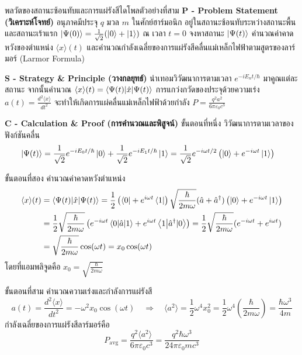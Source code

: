 \begin{psctbox}{พลวัตของสถานะซ้อนทับและการแผ่รังสีไดโพล}{ตัวอย่างที่สาม}
\noindent\textbf{P - Problem Statement (วิเคราะห์โจทย์)} อนุภาคมีประจุ $q$ มวล $m$ ในศักย์ฮาร์มอนิก อยู่ในสถานะซ้อนทับระหว่างสถานะพื้นและสถานะเร้าแรก $\ket{\Psi(0)} = \frac{1}{\sqrt{2}}(\ket{0} + \ket{1})$ ณ เวลา $t = 0$ จงหาสถานะ $\ket{\Psi(t)}$ คำนวณค่าคาดหวังของตำแหน่ง $\langle x \rangle(t)$ และคำนวณกำลังเฉลี่ยของการแผ่รังสีคลื่นแม่เหล็กไฟฟ้าตามสูตรของลาร์มอร์ (Larmor Formula)

\vspace{6pt}
\noindent\textbf{S - Strategy \& Principle (วางกลยุทธ์)} นำเทอมวิวัฒนาการตามเวลา $e^{-iE_n t/\hbar}$ มาคูณแต่ละสถานะ จากนั้นคำนวณ $\langle x \rangle(t) = \braket{\Psi(t)}{\hat{x}|\Psi(t)}$ การแกว่งกวัดของประจุด้วยความเร่ง $a(t) = \frac{d^2\langle x \rangle}{dt^2}$ จะทำให้เกิดการแผ่คลื่นแม่เหล็กไฟฟ้าด้วยกำลัง $P = \frac{q^2 a^2}{6\pi\varepsilon_0 c^3}$

\vspace{6pt}
\noindent\textbf{C - Calculation \& Proof (การคำนวณและพิสูจน์)}
ขั้นตอนที่หนึ่ง วิวัฒนาการตามเวลาของฟังก์ชันคลื่น
\begin{align}
\ket{\Psi(t)} &= \frac{1}{\sqrt{2}} e^{-iE_0 t/\hbar}\ket{0} + \frac{1}{\sqrt{2}} e^{-iE_1 t/\hbar}\ket{1} = \frac{1}{\sqrt{2}} e^{-i\omega t/2}\left( \ket{0} + e^{-i\omega t}\ket{1} \right)
\end{align}

ขั้นตอนที่สอง คำนวณค่าคาดหวังตำแหน่ง
\begin{align}
\langle x \rangle(t) &= \braket{\Psi(t)}{\hat{x}|\Psi(t)} = \frac{1}{2} \left( \bra{0} + e^{i\omega t}\bra{1} \right) \sqrt{\frac{\hbar}{2m\omega}}(\hat{a} + \hat{a}^\dagger) \left( \ket{0} + e^{-i\omega t}\ket{1} \right) \\
&= \frac{1}{2}\sqrt{\frac{\hbar}{2m\omega}} \left( e^{-i\omega t}\braket{0}{\hat{a}|1} + e^{i\omega t}\braket{1}{\hat{a}^\dagger|0} \right) = \frac{1}{2}\sqrt{\frac{\hbar}{2m\omega}} (e^{-i\omega t} + e^{i\omega t}) \\
&= \sqrt{\frac{\hbar}{2m\omega}} \cos(\omega t) = x_0 \cos(\omega t)
\end{align}
โดยที่แอมพลิจูดคือ $x_0 = \sqrt{\frac{\hbar}{2m\omega}}$

ขั้นตอนที่สาม คำนวณความเร่งและกำลังการแผ่รังสี
\begin{equation}
a(t) = \frac{d^2\langle x \rangle}{dt^2} = -\omega^2 x_0 \cos(\omega t) \quad \Longrightarrow \quad \langle a^2 \rangle = \frac{1}{2}\omega^4 x_0^2 = \frac{1}{2}\omega^4 \left(\frac{\hbar}{2m\omega}\right) = \frac{\hbar\omega^3}{4m}
\end{equation}
กำลังเฉลี่ยของการแผ่รังสีลาร์มอร์คือ
\begin{equation}
P_{\text{avg}} = \frac{q^2 \langle a^2 \rangle}{6\pi\varepsilon_0 c^3} = \frac{q^2 \hbar \omega^3}{24\pi\varepsilon_0 m c^3}
\end{equation}


\end{psctbox}

